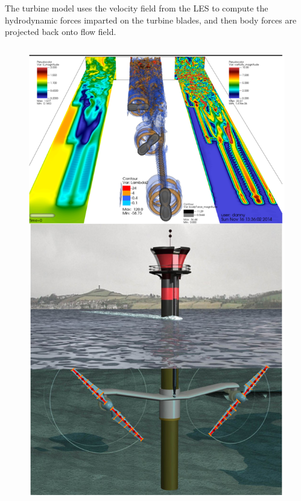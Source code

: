 \documentclass[xcolor=x11names,compress]{beamer}
\begin{document}
\begin{frame}{}

\small The turbine model uses the 
velocity field from the LES to compute the 
hydrodynamic forces imparted on the turbine blades, and
then body forces are projected back onto flow field.

\vspace{-10pt}

\begin{columns}
		    
    \begin{column}{0.3\textwidth}

\vspace{-10pt}

        \begin{figure}[p]
		    \centering
		    \includegraphics[width=1.1\textwidth]{figures/LES_and_cartoon_actuator_line.png}
		\end{figure}


\end{column}
\end{columns}
\end{frame}
\end{document}
